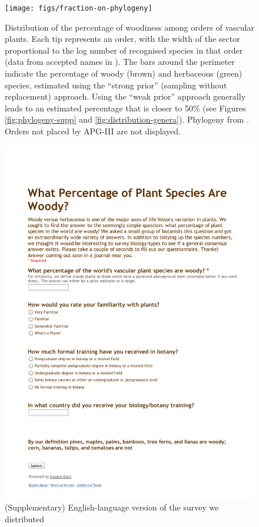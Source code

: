 \documentclass[a4paper,12pt]{article}
\begin{document}
\begin{figure}[p]
  \centering
  \texttt{[image: figs/fraction-on-phylogeny]}
  \caption{Distribution of the percentage of woodiness among orders of
    vascular plants.  Each tip represents an order, with the width of
    the sector proportional to the log number of recognised species in
    that order (data from accepted names in \citet{ThePlantList}).
    The bars around the perimeter indicate the percentage of woody
    (brown) and herbaceous (green) species, estimated using the
    ``strong prior'' (sampling without replacement) approach.  Using
    the ``weak prior'' approach generally leads to an estimated
    percentage that is closer to 50\% (see Figures
    \ref{fig:phylogeny-supp} and \ref{fig:distribution-genera}).
    Phylogeny from \citep{Zanne}.  Orders not placed by APG-III
    \citep{APG3} are not displayed.}
\label{fig:phylogeny}
\end{figure}

\clearpage
\renewcommand\thefigure{S.\arabic{figure}}
\renewcommand\thetable{S.\arabic{table}}
\setcounter{figure}{0}    
\setcounter{table}{0}    

\begin{figure}[p]
  \centering
  \vspace{-20ex}
  \includegraphics[scale=0.7]{figs/Survey_supplemental}
  \caption{(Supplementary) English-language version of the survey we
    distributed}
  \label{fig:survey-text}
\end{figure}
\end{document}
